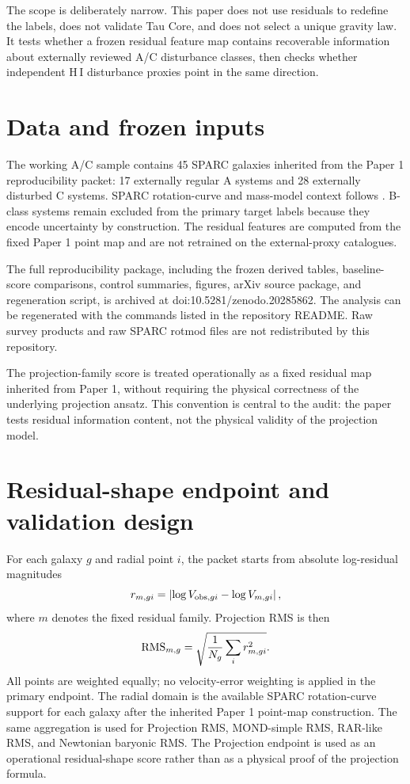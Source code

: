 \documentclass[11pt]{article}
\begin{document}
The scope is deliberately narrow. This paper does not use residuals to redefine the labels, does not validate Tau Core, and does not select a unique gravity law. It tests whether a frozen residual feature map contains recoverable information about externally reviewed A/C disturbance classes, then checks whether independent H\,I disturbance proxies point in the same direction.

\section{Data and frozen inputs}

The working A/C sample contains 45 SPARC galaxies inherited from the Paper 1 reproducibility packet: 17 externally regular A systems and 28 externally disturbed C systems. SPARC rotation-curve and mass-model context follows \cite{Lelli2016SPARC,Lelli2016SPARCZenodo}. B-class systems remain excluded from the primary target labels because they encode uncertainty by construction. The residual features are computed from the fixed Paper 1 point map and are not retrained on the external-proxy catalogues.

The full reproducibility package, including the frozen derived tables, baseline-score comparisons, control summaries, figures, arXiv source package, and regeneration script, is archived at doi:10.5281/zenodo.20285862. The analysis can be regenerated with the commands listed in the repository README. Raw survey products and raw SPARC rotmod files are not redistributed by this repository.

The projection-family score is treated operationally as a fixed residual map inherited from Paper 1, without requiring the physical correctness of the underlying projection ansatz. This convention is central to the audit: the paper tests residual information content, not the physical validity of the projection model.

\section{Residual-shape endpoint and validation design}

For each galaxy $g$ and radial point $i$, the packet starts from absolute log-residual magnitudes
\[
r_{{m,gi}} = \left|\log V_{{\rm obs},gi} - \log V_{{m,gi}}\right|,
\]
where $m$ denotes the fixed residual family. Projection RMS is then
\[
{\rm RMS}_{{m,g}} =
\sqrt{{1\over N_g}\sum_i r_{{m,gi}}^2}.
\]
All points are weighted equally; no velocity-error weighting is applied in the primary endpoint. The radial domain is the available SPARC rotation-curve support for each galaxy after the inherited Paper 1 point-map construction. The same aggregation is used for Projection RMS, MOND-simple RMS, RAR-like RMS, and Newtonian baryonic RMS. The Projection endpoint is used as an operational residual-shape score rather than as a physical proof of the projection formula.
\end{document}
